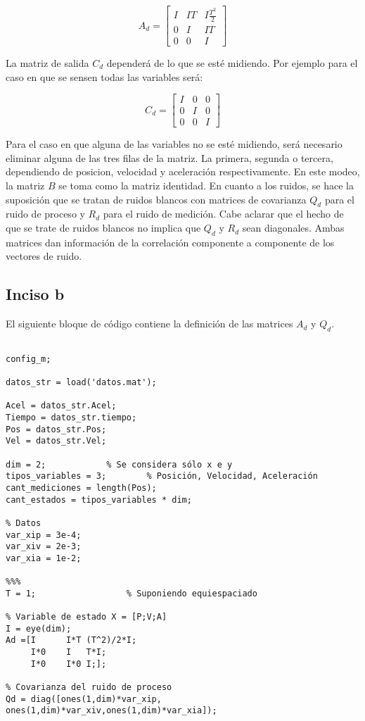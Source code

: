 		\begin{equation*}
			A_{d} = \begin{bmatrix} I & IT & I\frac{T^2}{2} \\[0.3em] 0 & I & IT \\[0.3em] 0 & 0 & I \end{bmatrix}
		\end{equation*}

	La matriz de salida $C_{d}$ dependerá de lo que se esté midiendo. Por ejemplo para el caso en que se sensen todas las variables será:
	
		\begin{equation*}
			C_{d} = \begin{bmatrix} I & 0 & 0 \\[0.3em] 0 & I & 0 \\[0.3em] 0 & 0 & I \end{bmatrix}
		\end{equation*}
		
		Para el caso en que alguna de las variables no se esté midiendo, será necesario eliminar alguna de las tres filas de la matriz. 
		La primera, segunda o tercera, dependiendo de posicion, velocidad y aceleración respectivamente. 
		En este modeo, la matriz $B$ se toma como la matriz identidad.
	En cuanto a los ruidos, se hace la suposición que se tratan de ruidos blancos con matrices de covarianza $Q_{d}$ para el ruido de proceso y $R_{d}$ para el ruido de medición. Cabe aclarar que el hecho de que se trate de ruidos blancos no implica que $Q_{d}$ y $R_{d}$ sean diagonales. Ambas matrices dan información de la correlación componente a componente de los vectores de ruido.
	
\subsection{Inciso b}

	El siguiente bloque de código contiene la definición de las matrices $A_{d}$ y $Q_{d}$.

	\begin{lstlisting}
	
config_m;

datos_str = load('datos.mat');

Acel = datos_str.Acel;
Tiempo = datos_str.tiempo;
Pos = datos_str.Pos;
Vel = datos_str.Vel;

dim = 2;			% Se considera sólo x e y
tipos_variables = 3;		% Posición, Velocidad, Aceleración
cant_mediciones = length(Pos);
cant_estados = tipos_variables * dim;

% Datos
var_xip = 3e-4;
var_xiv = 2e-3;
var_xia = 1e-2;

%%%
T = 1;					% Suponiendo equiespaciado

% Variable de estado X = [P;V;A]
I = eye(dim);
Ad =[I		I*T	(T^2)/2*I;
     I*0	I	T*I;
     I*0	I*0	I;];

% Covarianza del ruido de proceso
Qd = diag([ones(1,dim)*var_xip, ones(1,dim)*var_xiv,ones(1,dim)*var_xia]);

	\end{lstlisting}
	
